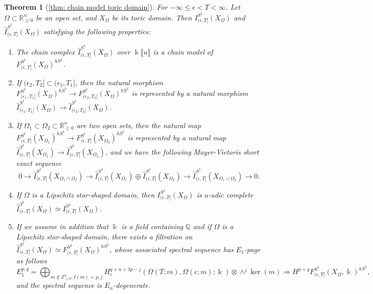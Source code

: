 \documentclass[11pt]{amsart}
\numberwithin{equation}{section}
\theoremstyle{plain}
\newtheorem{Thm}{Theorem}[section]
\theoremstyle{definition}
\theoremstyle{remark}
\newcommand{\bQ} { {\mathbb{Q}}}
\newcommand{\bZ} { {\mathbb{Z}}}
\newcommand{\bR} { {\mathbb{R}}}
\newcommand{\fpw}[1]{{\llbracket #1\rrbracket}}
\begin{document}
\begin{Thm}[{\autoref{thm: chain model toric domain}}]
For $-\infty \leq \epsilon<T<\infty$. Let $\Omega\subset \bR_{\geq 0}^n$ be an open set, and $X_\Omega$ be its toric domain. Then $I^{S^1}_{(\epsilon,T]}(X_\Omega)$ and $\widehat{I}^{S^1}_{(\epsilon,T]}(X_\Omega)$ satisfying the following properties:

\begin{enumerate}[fullwidth]
\item The chain complex $\widehat{I}^{S^1}_{(\epsilon,T]}(X_\Omega)$ over $\Bbbk\fpw{u}$ is a chain model of $F_{(\epsilon,T]}^{S^1}(X_\Omega)^{hS^1}$. 

\item If $(\epsilon_2,T_2]\subset (\epsilon_1,T_1]$, then the natural morphism $F_{(\epsilon_1,T_1]}^{S^1}(X_\Omega)^{hS^1}\to F_{(\epsilon_2,T_2]}^{S^1}(X_\Omega)^{hS^1}$ is represented by a natural morphism $\widehat{I}_{(\epsilon_1,T_1]}^{S^1}(X_\Omega)\to\widehat{I}_{(\epsilon_2,T_2]}^{S^1}(X_\Omega)$. 

\item If $\Omega_1\subset \Omega_2 \subset \bR^n_{\geq 0}$ are two open sets, then the natural map $F_{(\epsilon,T]}^{S^1}(X_{\Omega_1})^{hS^1}\to F_{(\epsilon,T]}^{S^1}(X_{\Omega_2})^{hS^1}$ is represented by a natural map $\widehat{I}^{S^1}_{(\epsilon,T]}(X_{\Omega_1})\to \widehat{I}^{S^1}_{(\epsilon,T]}(X_{\Omega_2})$, and we have the following Mayer-Vietoris short exact sequence
\[0\to \widehat{I}^{S^1}_{(\epsilon,T]}(X_{\Omega_1\cap \Omega_2})\to \widehat{I}^{S^1}_{(\epsilon,T]}(X_{\Omega_1})\oplus \widehat{I}^{S^1}_{(\epsilon,T]}(X_{\Omega_2})\to \widehat{I}^{S^1}_{(\epsilon,T]}(X_{\Omega_1\cup \Omega_2})\to 0.\]

\item If $\Omega$ is a Lipschitz star-shaped domain, then $I^{S^1}_{(\epsilon,T]}(X_\Omega)$ is $u$-adic complete $\widehat{I}^{S^1}_{(\epsilon,T]}(X_\Omega)\simeq I^{S^1}_{(\epsilon,T]}(X_\Omega)$.

\item  If we assume in addition that $\Bbbk$ is a field containing $\bQ$ and if $\Omega$ is a Lipschitz star-shaped domain, there exists a filtration on $\widehat{I}^{S^1}_{(\epsilon,T]}(X_\Omega)\simeq F_{(\epsilon,T]}^{S^1}(X_\Omega)^{hS^1}$, whose associated spectral sequence has $E_1$-page as follows 
\[E_1^{p,q}=\bigoplus_{m\notin \bZ^n_{\geq 0}, I(m)= p,j} H^{q+n+3p-j}_c({\Omega(T;m)},\Omega(\epsilon;m) ;\Bbbk )   \otimes \wedge^j \ker(m) \Rightarrow H^{p+q} F_{(\epsilon,T]}^{S^1}(X_\Omega,\Bbbk)^{hS^1},\]
and the spectral sequence is $E_n$-degenerate. 
\end{enumerate} 
\end{Thm}
\end{document}
